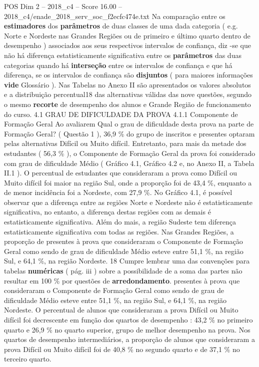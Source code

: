 \begin{textsample}{POS Dim 2 – 2018\_c4 – Score 16.00 – 2018\_c4/enade\_2018\_serv\_soc\_f2ecfc474e.txt}
Na comparação entre os \textbf{estimadores} dos \textbf{parâmetros} de duas classes de uma dada categoria ( e.g.
Norte e Nordeste nas Grandes Regiões ou de primeiro e último quarto dentro de desempenho ) associados aos seus respectivos intervalos de confiança, diz -se que não há diferença estatisticamente significativa entre os \textbf{parâmetros} das duas categorias quando há \textbf{interseção} entre os intervalos de confiança e que há diferença, se os intervalos de confiança são \textbf{disjuntos} ( para maiores informações \textbf{vide} Glossário ).
Nas Tabelas no Anexo II são apresentados os valores absolutos e a distribuição percentual18 das alternativas válidas das nove questões, segundo o mesmo \textbf{recorte} de desempenho dos alunos e Grande Região de funcionamento do curso. 4.1 GRAU DE DIFICULDADE DA PROVA 4.1.1 Componente de Formação Geral Ao avaliarem Qual o grau de dificuldade desta prova na parte de Formação Geral? ( Questão 1 ), 36,9 \% do grupo de inscritos e presentes optaram pelas alternativas Difícil ou Muito difícil.
Entretanto, para mais da metade dos estudantes ( 56,3 \% ), o Componente de Formação Geral da prova foi considerado com grau de dificuldade Médio ( Gráfico 4.1, Gráfico 4.2 e, no Anexo II, a Tabela II.1 ).
O percentual de estudantes que consideraram a prova como Difícil ou Muito difícil foi maior na região Sul, onde a proporção foi de 43,4 \%, enquanto a de menor incidência foi a Nordeste, com 27,9 \%.
No Gráfico 4.1, é possível observar que a diferença entre as regiões Norte e Nordeste não é estatisticamente significativa, no entanto, a diferença destas regiões com as demais é estatisticamente significativa.
Além do mais, a região Sudeste tem diferença estatisticamente significativa com todas as regiões.
Nas Grandes Regiões, a proporção de presentes à prova que consideraram o Componente de Formação Geral como sendo de grau de dificuldade Médio esteve entre 51,1 \%, na região Sul, e 64,1 \%, na região Nordeste. 18 Cumpre lembrar uma das convenções para tabelas \textbf{numéricas} ( pág. iii ) sobre a possibilidade de a soma das partes não resultar em 100 \% por questões de \textbf{arredondamento}. presentes à prova que consideraram o Componente de Formação Geral como sendo de grau de dificuldade Médio esteve entre 51,1 \%, na região Sul, e 64,1 \%, na região Nordeste.
O percentual de alunos que consideraram a prova Difícil ou Muito difícil foi decrescente em função dos quartos de desempenho : 43,2 \% no primeiro quarto e 26,9 \% no quarto superior, grupo de melhor desempenho na prova.
Nos quartos de desempenho intermediários, a proporção de alunos que consideraram a prova Difícil ou Muito difícil foi de 40,8 \% no segundo quarto e de 37,1 \% no terceiro quarto.

\end{textsample}
